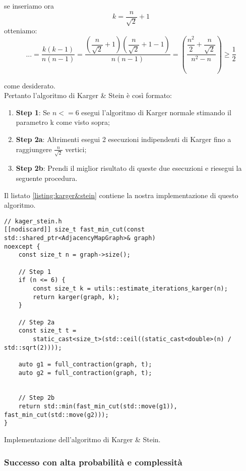 \noindent se inseriamo ora $$ k = \dfrac{n}{\sqrt{2}} + 1$$ otteniamo:
$$ ... = \dfrac{k(k-1)}{n(n-1)} = \dfrac{(\dfrac{n}{\sqrt{2}} + 1) (\dfrac{n}{\sqrt{2}} + 1 - 1)}{n(n-1)} = (\dfrac{\dfrac{n^2}{2} + \dfrac{n}{\sqrt{2}}}{n^2 - n}) \geq \dfrac{1}{2}$$

\noindent come desiderato.\\

\noindent Pertanto l'algoritmo di Karger \& Stein è così formato:
\begin{enumerate}
    \item \textbf{Step 1}: Se $n <= 6$ esegui l'algoritmo di Karger normale stimando il parametro k come visto sopra;
    \item \textbf{Step 2a}: Altrimenti esegui 2 esecuzioni indipendenti di Karger fino a raggiungere $\frac{n}{\sqrt{2}}$ vertici;
    \item \textbf{Step 2b}: Prendi il miglior risultato di queste due esecuzioni e riesegui la seguente procedura.
\end{enumerate}

Il listato \ref{listing:karger&stein} contiene la nostra implementazione di questo algoritmo.


\begin{listing}[!ht]
\begin{verbatim}
// kager_stein.h
[[nodiscard]] size_t fast_min_cut(const std::shared_ptr<AdjacencyMapGraph>& graph) 
noexcept {
    const size_t n = graph->size();
    
    // Step 1
    if (n <= 6) {
        const size_t k = utils::estimate_iterations_karger(n);
        return karger(graph, k);
    }
    
    // Step 2a
    const size_t t =
        static_cast<size_t>(std::ceil((static_cast<double>(n) / std::sqrt(2))));

    auto g1 = full_contraction(graph, t);
    auto g2 = full_contraction(graph, t);


    // Step 2b
    return std::min(fast_min_cut(std::move(g1)), fast_min_cut(std::move(g2)));
}
\end{verbatim}
\caption{Implementazione dell'algoritmo di Karger \& Stein.}
\label{listing:karger&stein}
\end{listing}


\subsubsection{Successo con alta probabilità e complessità}
\label{sub:karger-stein-success-whp}

